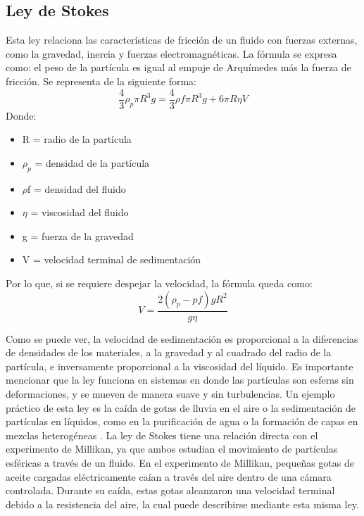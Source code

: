 \documentclass[
 reprint,
 amsmath,amssymb,
 aps,
]{revtex4-2}
\begin{document}
\subsection{\label{sec:levels}Ley de Stokes}
Esta ley relaciona las características de fricción de un fluido con fuerzas externas, como la gravedad, inercia y fuerzas electromagnéticas. 
La fórmula se expresa como: el peso de la partícula es igual al empuje de Arquímedes más la fuerza de fricción. Se representa de la siguiente forma:
\begin{equation}
   \frac{4}{3}\rho_p\pi R^3g=\frac{4}{3}\rho f\pi R^3g+6\pi R\eta V 
   \label{stokes}
\end{equation}
Donde:
\begin{itemize}
  \item R = radio de la partícula
  \item \(\rho_p\) = densidad de la partícula
  \item \(\rho\)f = densidad del fluido
  \item \(\eta\) = viscosidad del fluido
  \item g = fuerza de la gravedad
  \item V = velocidad terminal de sedimentación
\end{itemize}
Por lo que, si se requiere despejar la velocidad, la fórmula queda como:
\begin{equation}
    V=\frac{2(\rho_p-pf)gR^2}{g\eta}
\end{equation}

Como se puede ver, la velocidad de sedimentación es proporcional a la diferencias de densidades de los materiales, a la gravedad y al cuadrado del radio de la partícula, e inversamente proporcional a la viscosidad del líquido.
Es importante mencionar que la ley funciona en sistemas en donde las partículas son esferas sin deformaciones, y se mueven de manera suave y sin turbulencias.
Un ejemplo práctico de esta ley es la caída de gotas de lluvia en el aire o la sedimentación de partículas en líquidos, como en la purificación de agua o la formación de capas en mezclas heterogéneas \cite{shearer2008fluid}.
La ley de Stokes tiene una relación directa con el experimento de Millikan, ya que ambos estudian el movimiento de partículas esféricas a través de un fluido. En el experimento de Millikan, pequeñas gotas de aceite cargadas eléctricamente caían a través del aire dentro de una cámara controlada. Durante su caída, estas gotas alcanzaron una velocidad terminal debido a la resistencia del aire, la cual puede describirse mediante esta misma ley.
\end{document}
